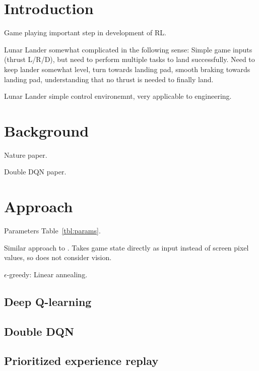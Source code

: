 \documentclass{article}
\begin{document}
\section{Introduction}
\label{introduction}

Game playing important step in development of RL.

Lunar Lander somewhat complicated in the following sense: Simple game inputs (thrust L/R/D), but need to perform multiple tasks to land successfully. Need to keep lander somewhat level, turn towards landing pad, smooth braking towards landing pad, understanding that no thrust is needed to finally land.

Lunar Lander simple control environemnt, very applicable to engineering.

\section{Background}
\label{background}

Nature paper. \cite{mnih2015humanlevel}

Double DQN paper. \cite{Hasselt2016DeepRL}

\section{Approach}
\label{approach}
Parameters Table~\ref{tbl:params}.

Similar approach to \cite{Mnih2013PlayingAW}. Takes game state directly as input instead of screen pixel values, so does not consider vision.

$\epsilon$-greedy: Linear annealing.

\subsection{Deep Q-learning}

\subsection{Double DQN}

\subsection{Prioritized experience replay}
\end{document}
